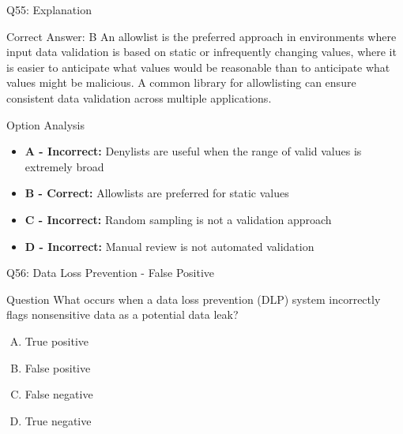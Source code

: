 \documentclass{beamer}
\begin{document}
	\begin{frame}{Q55: Explanation}
		\begin{block}{Correct Answer: B}
			An allowlist is the preferred approach in environments where input data validation is based on static or infrequently changing values, where it is easier to anticipate what values would be reasonable than to anticipate what values might be malicious. A common library for allowlisting can ensure consistent data validation across multiple applications.
		\end{block}
		\begin{block}{Option Analysis}
			\begin{itemize}
				\item \textbf{A - Incorrect:} Denylists are useful when the range of valid values is extremely broad
				\item \textbf{B - Correct:} Allowlists are preferred for static values
				\item \textbf{C - Incorrect:} Random sampling is not a validation approach
				\item \textbf{D - Incorrect:} Manual review is not automated validation
			\end{itemize}
		\end{block}
	\end{frame}
	
	\begin{frame}{Q56: Data Loss Prevention - False Positive}
		\begin{block}{Question}
			What occurs when a data loss prevention (DLP) system incorrectly flags nonsensitive data as a potential data leak?
		\end{block}
		\begin{enumerate}[(A)]
			\item True positive
			\item False positive
			\item False negative
			\item True negative
		\end{enumerate}
	\end{frame}
	
\end{document}
